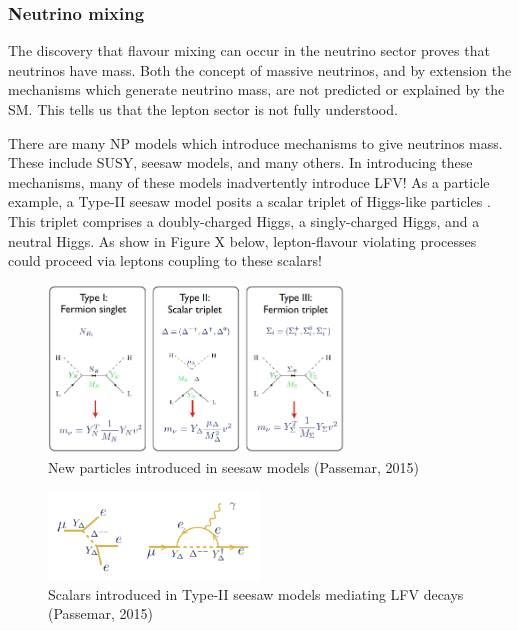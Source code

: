 \documentclass[12pt,a4paper]{article} %
\begin{document}
\subsubsection{Neutrino mixing}

The discovery that flavour mixing can occur in the neutrino sector \cite{SuperK:1998}\cite{SNO:2002} proves that neutrinos have mass. Both the concept of massive neutrinos, and by extension the mechanisms which generate neutrino mass, are not predicted or explained by the SM. This tells us that the lepton sector is not fully understood.

There are many NP models which introduce mechanisms to give neutrinos mass. These include SUSY, seesaw models, and many others. In introducing these mechanisms, many of these models inadvertently introduce LFV! As a particle example, a Type-II seesaw model posits a scalar triplet of Higgs-like particles \cite{Passemar:2015}. This triplet comprises a doubly-charged Higgs, a singly-charged Higgs, and a neutral Higgs. As show in Figure X below, lepton-flavour violating processes could proceed via leptons coupling to these scalars!


\begin{figure}[h]
\centering
\includegraphics[width=0.7\textwidth]{images/seesaw.png}
\caption{New particles introduced in seesaw models (Passemar, 2015)}
\label{}
\end{figure}

\begin{figure}[h]
\centering
\includegraphics[width=0.5\textwidth]{images/seesaw-lfv-modes.png}
\caption{Scalars introduced in Type-II seesaw models mediating LFV decays (Passemar, 2015)}
\label{}
\end{figure}
\end{document}
